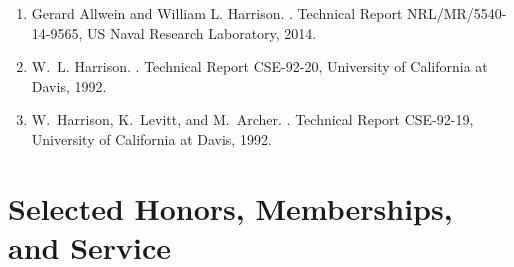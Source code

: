 \documentclass[12pt]{article} %
\begin{document}
\begin{enumerate}[leftmargin=0.0mm]

\item
Gerard Allwein and William L. Harrison.
.
\newblock Technical Report NRL/MR/5540-14-9565, US Naval Research Laboratory, 2014. 

\item
W.~L. Harrison.
.
\newblock Technical Report CSE-92-20, University of California at Davis, 1992.


\item
W.~Harrison, K.~Levitt, and M.~Archer.
.
\newblock Technical Report CSE-92-19, University of California at Davis, 1992.

\end{enumerate}


\section*{Selected Honors, Memberships, and Service}
\end{document}
